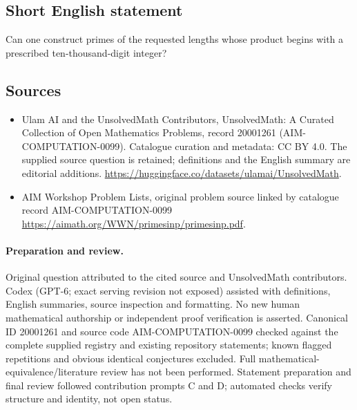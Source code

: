 \documentclass[11pt]{article}
\begin{document}
\subsection{Short English statement}
Can one construct primes of the requested lengths whose product begins with a prescribed ten-thousand-digit integer?
\subsection{Sources}
\begin{itemize}
\item[\hypertarget{source:20001261:1}{S1}] Ulam AI and the UnsolvedMath Contributors, UnsolvedMath: A Curated Collection of Open Mathematics Problems, record 20001261 (AIM-COMPUTATION-0099). Catalogue curation and metadata: CC BY 4.0. The supplied source question is retained; definitions and the English summary are editorial additions.
\url{https://huggingface.co/datasets/ulamai/UnsolvedMath}.
\item[\hypertarget{source:20001261:2}{S2}] AIM Workshop Problem Lists, original problem source linked by catalogue record AIM-COMPUTATION-0099
\url{https://aimath.org/WWN/primesinp/primesinp.pdf}.
\end{itemize}
\paragraph{Preparation and review.}
Original question attributed to the cited source and UnsolvedMath contributors. Codex (GPT-6; exact serving revision not exposed) assisted with definitions, English summaries, source inspection and formatting. No new human mathematical authorship or independent proof verification is asserted. Canonical ID 20001261 and source code AIM-COMPUTATION-0099 checked against the complete supplied registry and existing repository statements; known flagged repetitions and obvious identical conjectures excluded. Full mathematical-equivalence/literature review has not been performed. Statement preparation and final review followed contribution prompts C and D; automated checks verify structure and identity, not open status.
\label{end:20001261}
\end{document}
